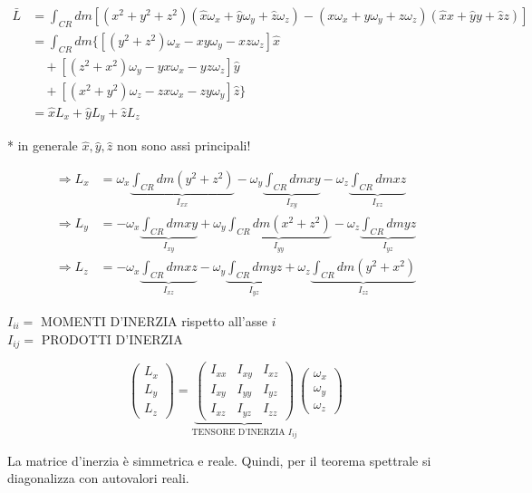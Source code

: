 \begin{align*}
\bar{L} &= \int_{CR} dm \left[ (x^2+y^2+z^2)(\hat{x}\omega_x + \hat{y}\omega_y + \hat{z}\omega_z) - (x\omega_x + y\omega_y + z\omega_z)(\hat{x}x + \hat{y}y + \hat{z}z) \right] \\
&= \int_{CR} dm \Big\{ \left[ (y^2+z^2)\omega_x - xy\omega_y - xz\omega_z \right]\hat{x} \\
&\quad + \left[ (z^2+x^2)\omega_y - yx\omega_x - yz\omega_z \right]\hat{y} \\
&\quad + \left[ (x^2+y^2)\omega_z - zx\omega_x - zy\omega_y \right]\hat{z} \Big\} \\
&= \hat{x}L_x + \hat{y}L_y + \hat{z}L_z
\end{align*}

* in generale $\hat{x}, \hat{y}, \hat{z}$ non sono assi principali!



\begin{align*}
\Rightarrow L_x &= \omega_x \underbrace{\int_{CR} dm (y^2+z^2)}_{I_{xx}} - \omega_y \underbrace{\int_{CR} dm xy}_{I_{xy}} - \omega_z \underbrace{\int_{CR} dm xz}_{I_{xz}} \\
\Rightarrow L_y &= -\omega_x \underbrace{\int_{CR} dm xy}_{I_{xy}} + \omega_y \underbrace{\int_{CR} dm (x^2+z^2)}_{I_{yy}} - \omega_z \underbrace{\int_{CR} dm yz}_{I_{yz}} \\
\Rightarrow L_z &= -\omega_x \underbrace{\int_{CR} dm xz}_{I_{xz}} - \omega_y \underbrace{\int_{CR} dm yz}_{I_{yz}} + \omega_z \underbrace{\int_{CR} dm (y^2+x^2)}_{I_{zz}}
\end{align*}

$I_{ii} = $ MOMENTI D'INERZIA rispetto all'asse $i$ \\
$I_{ij} = $ PRODOTTI D'INERZIA

\begin{minipage}{0.5\textwidth}
\begin{equation}
    \begin{pmatrix}
L_x \\ L_y \\ L_z
\end{pmatrix}
=
\underbrace{
\begin{pmatrix}
I_{xx} & I_{xy} & I_{xz} \\
I_{xy} & I_{yy} & I_{yz} \\
I_{xz} & I_{yz} & I_{zz}
\end{pmatrix}
}_{\text{TENSORE D'INERZIA } I_{ij}}
\begin{pmatrix}
\omega_x \\ \omega_y \\ \omega_z
\end{pmatrix}
\end{equation}
\end{minipage}
\begin{minipage}{0.45\textwidth}
La matrice d'inerzia è simmetrica e reale. Quindi, per il teorema spettrale si diagonalizza con autovalori reali.
\end{minipage}

